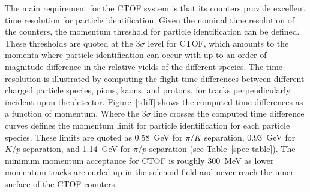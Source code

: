 \documentclass{elsart}
\begin{document}
The main requirement for the CTOF system is that its counters provide excellent time resolution 
for particle identification. Given the nominal time resolution of the counters, the momentum 
threshold for particle identification can be defined. These thresholds are quoted at the 3$\sigma$
level for CTOF, which amounts to the momenta where particle identification can occur with up to an
order of magnitude difference in the relative yields of the different species. The time resolution is
illustrated by computing the flight time differences between different charged particle species, pions,
kaons, and protons, for tracks perpendicularly incident upon the detector. Figure~\ref{tdiff} shows the
computed time differences as a function of momentum. Where the 3$\sigma$ line crosses the computed
time difference curves defines the momentum limit for particle identification for each particle species.
These limits are quoted as 0.58~GeV for $\pi/K$ separation, 0.93~GeV for $K/p$ separation, and
1.14~GeV for $\pi/p$ separation (see Table~\ref{spec-table}). The minimum momentum acceptance
for CTOF is roughly 300~MeV as lower momentum tracks are curled up in the solenoid field and never
reach the inner surface of the CTOF counters.
\end{document}
